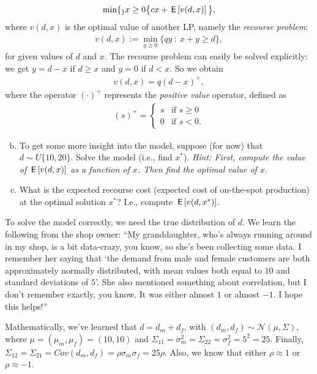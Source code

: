 \documentclass[assignments]{subfiles}
\begin{document}
\begin{exercise}
\begin{align}
    \mathrm{min}\{_\}{x \geq 0} \big\{ cx + \,\mathsf{E}\left[v(d,x)\right] \big\},
\end{align}
where $v(d,x)$ is the optimal value of another LP, namely the \textit{recourse problem}:
\begin{align}
    v(d,x) := \min_{y \geq 0} \{ qy \ : \ x + y \geq d \},
\end{align}
for given values of $d$ and $x$. The recourse problem can easily be solved explicitly: we get $y=d-x$ if $d \geq x$ and $y=0$ if $d < x$. So we obtain
\begin{align}
    v(d,x) = q (d - x)^+,
\end{align}
where the operator $(\cdot)^+$ represents the \textit{positive value} operator, defined as
\begin{align}
    (s)^+ = \begin{cases}
    s &\text{if } s \geq 0\\
    0 &\text{if } s < 0.
    \end{cases}
\end{align}

\begin{enumerate}[(a)]
    \setcounter{enumi}{1}
    \item To get some more insight into the model, suppose (for now) that $d \sim U\{10, 20\}$. Solve the model (i.e., find $x^*$). \textit{Hint: First, compute the value of $\,\mathsf{E}\left[v(d,x)\right]$ as a function of $x$. Then find the optimal value of $x$.}
    \item What is the expected recourse cost (expected cost of on-the-spot production) at the optimal solution $x^*$? I.e., compute $\,\mathsf{E}\left[v(d,x^*)\right]$. 
\end{enumerate}

To solve the model correctly, we need the true distribution of $d$. We learn the following from the shop owner: ``My granddaughter, who's always running around in my shop, is a bit data-crazy, you know, so she's been collecting some data. I remember her saying that `the demand from male and female customers are both approximately normally distributed, with mean values both equal to $10$ and standard deviations of $5$'. She also mentioned something about correlation, but I don't remember exactly, you know. It was either almost $1$ or almost $-1$. I hope this helps!''

Mathematically, we've learned that $d = d_m + d_f$, with $(d_m, d_f) \sim \mathcal{N}(\mu, \Sigma)$, where $\mu = (\mu_m, \mu_f) = (10,10)$ and $\Sigma_{11} = \sigma_m^2 = \Sigma_{22}  = \sigma_f^2 = 5^2 = 25$. Finally, $\Sigma_{12} = \Sigma_{21} = Cov(d_m, d_f) = \rho \sigma_m \sigma_f = 25 \rho$. Also, we know that either $\rho \approx 1$ or $\rho \approx -1$.


\end{exercise}
\end{document}

